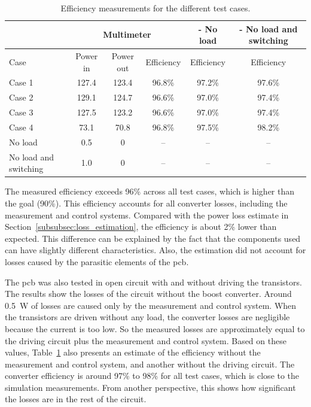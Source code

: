         \begin{table}[!ht]
            \centering
            \caption{Efficiency measurements for the different test cases.}
            \label{tab:efficiency_results}
            \begin{tabular}{|l|ccc|cc|}
                \hline
                & \multicolumn{3}{c|}{Multimeter} 
                & - No load 
                & - No load and switching  \\
                \hline
                Case & Power in & Power out & Efficiency 
                & Efficiency & Efficiency \\
                \hline
                Case 1 & 127.4 & 123.4 & 96.8\% & 97.2\% & 97.6\% \\
                Case 2 & 129.1 & 124.7 & 96.6\% & 97.0\% & 97.4\% \\
                Case 3 & 127.5 & 123.2 & 96.6\% & 97.0\% & 97.4\% \\
                Case 4 & 73.1 & 70.8 & 96.8\% & 97.5\% & 98.2\% \\
                \hline
                No load & 0.5 & 0 & -- & -- & -- \\
                No load and switching & 1.0 & 0 & -- & -- & -- \\
                \hline
            \end{tabular}
        \end{table}

        The measured efficiency exceeds 96\% across all test cases, which is higher than the goal (90\%). This efficiency accounts for all converter losses, including the measurement and control systems. Compared with the power loss estimate in Section~\ref{subsubsec:loss_estimation}, the efficiency is about 2\% lower than expected. This difference can be explained by the fact that the components used can have slightly different characteristics. Also, the estimation did not account for losses caused by the parasitic elements of the \ac{pcb}.

        The \ac{pcb} was also tested in open circuit with and without driving the transistors. The results show the losses of the circuit without the boost converter. Around 0.5~W of losses are caused only by the measurement and control system. When the transistors are driven without any load, the converter losses are negligible because the current is too low. So the measured losses are approximately equal to the driving circuit plus the measurement and control system. Based on these values, Table~\ref{tab:efficiency_results} also presents an estimate of the efficiency without the measurement and control system, and another without the driving circuit. The converter efficiency is around 97\% to 98\% for all test cases, which is close to the simulation measurements. From another perspective, this shows how significant the losses are in the rest of the circuit.    
        
